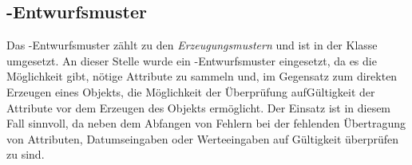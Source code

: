 \subsection*{-Entwurfsmuster}
Das -Entwurfsmuster zählt zu den \textit{Erzeugungsmustern} und ist in der Klasse \href{https://github.com/lucasmerkel/dhbw-advancedswe-programmentwurf/blob/d5c89113d12c3b877ddc4d6a99225b277ddd468f/swe_programmentwurf/consumergoods-inventory-planner/3-cip-domain/src/main/java/de/dhbw/cip/domain/ConsumerGoods.java#L72}{} umgesetzt.
An dieser Stelle wurde ein -Entwurfsmuster eingesetzt, da es die Möglichkeit gibt, nötige Attribute zu sammeln und, im Gegensatz zum direkten Erzeugen eines Objekts, die Möglichkeit der Überprüfung aufGültigkeit der Attribute vor dem Erzeugen des Objekts ermöglicht.
Der Einsatz ist in diesem Fall sinnvoll, da neben dem Abfangen von Fehlern bei der fehlenden Übertragung von Attributen, Datumseingaben oder Werteeingaben auf Gültigkeit überprüfen zu sind.

